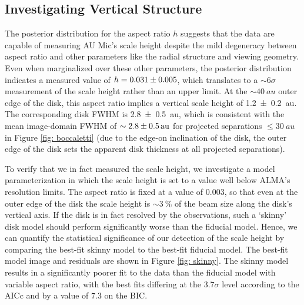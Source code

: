 \documentclass[modern]{aastex62}
\begin{document}
\subsection{Investigating Vertical Structure}
\label{subsection: vertical analysis}

The posterior distribution for the aspect ratio $h$ suggests that the data are capable of measuring AU Mic's scale height despite the mild degeneracy between aspect ratio and other parameters like the radial structure and viewing geometry.  
Even when marginalized over these other parameters, the posterior distribution indicates a measured value of $h=\num{0.031 \pm 0.005}$, which translates to a $\sim 6 \sigma$ measurement of the scale height rather than an upper limit.
At the $\sim \SI{40}{au}$ outer edge of the disk, this aspect ratio implies a vertical scale height of \SI{1.2 \pm 0.2}{au}. 
The corresponding disk FWHM is \SI{2.8 \pm 0.5}{au}, which is consistent with the mean image-domain FWHM of $\sim \SI{2.8 \pm 0.5}{au}$ for projected separations $\leq \SI{30}{au}$  in Figure \ref{fig: boccaletti}
(due to the edge-on inclination of the disk, the outer edge of the disk sets the apparent disk thickness at all projected separations).

To verify that we in fact measured the scale height, we investigate a model parameterization in which the scale height is set to a value well below ALMA's resolution limits.
The aspect ratio is fixed at a value of $0.003$, so that even at the outer edge of the disk the scale height is $\sim \SI{3}{\percent}$ of the beam size along the disk's vertical axis.
If the disk is in fact resolved by the observations, such a `skinny' disk model should perform significantly worse than the fiducial model.
Hence, we can quantify the statistical significance of our detection of the scale height by comparing the best-fit skinny model to the best-fit fiducial model.
The best-fit model image and residuals are shown in Figure \ref{fig: skinny}.
The skinny model results in a significantly poorer fit to the data than the fiducial model with variable aspect ratio, with the best fits differing at the $3.7 \sigma$ level according to the AICc and by a value of 7.3 on the BIC.
\end{document}
